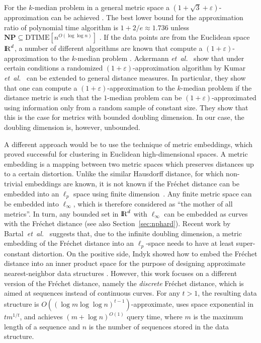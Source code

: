 \documentclass[11pt, letter]{article}
\newcommand{\etal}{\textit{e{}t~a{}l.}\xspace}
\newcommand{\secref}[1]{Section~\ref{sec:#1}}
\newcommand{\NP}{\textbf{NP}} \newcommand{\spine}{\textsl{spine}}
\newcommand{\Frechet}{Fr\'echet\xspace}
\providecommand{\eps}{{\varepsilon}}\newcommand{\Astop}{\overline{a}}
\providecommand{\pth}[2][\!]{#1\left({#2}\right)}
\renewcommand{\Re}{{\rm I\!\hspace{-0.025em} R}}
\begin{document}
For the $k$-median problem in a general metric space a
$(1+\sqrt{3}+\eps)$-approximation can be achieved \cite{ls-akm-13}. The
best lower bound for the approximation ratio of polynomial time algorithm is
$1+2/e\approx 1.736$ unless $\NP\subseteq \text{DTIME}\left[ n^{O(\log\log n)}\right]$ \cite{jain2002greedy}. If the data points are from the
Euclidean space $\Re^d$, a number of different algorithms are known that compute
a $(1+\eps)$-approximation to the $k$-median problem 
\cite{c-kmc-09,FeldmanLangberg11, HarPeledKushal07, harpeledmazumdar2004, KR99, kumar2010lineartime}. 
Ackermann \etal~\cite{abs-cm-10}
show that under certain conditions a randomized $(1+\eps)$-approximation algorithm by Kumar
\etal~\cite{kumar2010lineartime} can be extended to general distance measures. 
In particular, they show that one can compute a $(1+\eps)$-approximation to 
the $k$-median problem if the distance metric is such that the $1$-median 
problem can be $(1+\eps)$-approximated using information only from a random
sample of constant size. They show that this is the case for
metrics with bounded doubling dimension. In our case, the doubling dimension is,
however, unbounded.



A different approach would be to use the technique of metric
embeddings, which proved successful for clustering in Euclidean 
high-dimensional spaces. A metric embedding is a mapping between two metric
spaces which preserves distances up to a certain distortion.
Unlike the similar Hausdorff distance, for which non-trivial embeddings are
known, it is not known if the \Frechet distance can be embedded into
an $\ell_{p}$ space using finite dimension~\cite{IndMat04}.
Any finite metric space can be embedded into
$\ell_\infty$, which is therefore considered as ``the
mother of all metrics''. In turn, any bounded set in $\Re^d$ with $\ell_{\infty}$ 
can be embedded as curves with the \Frechet distance (see also
\secref{nphard}).   Recent work by Bartal~\etal~\cite{bartal2014impossible}
suggests that, due to the infinite doubling dimension, a metric embedding of the
\Frechet distance into an $\ell_p$-space needs to have at least super-constant
distortion.  On the positive side, Indyk showed how to embed the \Frechet
distance into an inner product space for the purpose of designing approximate
nearest-neighbor data structures \cite{i-approxnn-02}. 
However, this work focuses on a different version of the \Frechet distance,
namely the \emph{discrete} \Frechet distance, which is aimed at sequences
instead of continuous curves. For any $t>1$, the resulting data structure is
$O(\pth{\log m \log \log n}^{t-1})$-approximate, uses space exponential in
$tm^{1/t}$, and achieves $(m+\log n)^{O(1)}$ query time, where $m$ is the maximum length of
a sequence and $n$ is the number of sequences stored in the data structure. 
\end{document}
